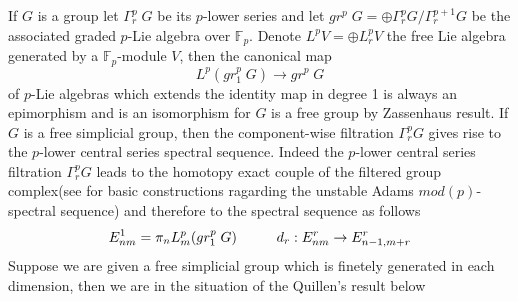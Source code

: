 \documentclass[11pt,a4paper]{article}
\begin{document}
If $G$ is a group let $\Gamma_r^p\; G$ be its $p$-lower series and let $gr^p\; G=\oplus \Gamma_r^p G/\Gamma_r^{p+1} G$ be the associated graded $p$-Lie algebra over $\mathbb{F}_p$.
Denote $L^p V= \oplus L^p_r V$ the free Lie algebra generated by a $\mathbb{F}_p$-module $V$, then the canonical map 
$$L^p(gr^p_1\; G)\rightarrow gr^p \; G$$
of $p$-Lie algebras which extends the identity map in degree 1 is always an epimorphism and is an isomorphism for $G$ is a free group by Zassenhaus result.
If $G$ is a free simplicial group, then the component-wise filtration $\Gamma_r^p G$ gives rise to the $p$-lower central series spectral sequence. Indeed  the $p$-lower central series filtration $\Gamma_r^p G$ leads to the homotopy exact couple of the filtered group complex(see \cite{Rec} for basic constructions ragarding the unstable Adams $mod(p)$-spectral sequence) and therefore to the spectral sequence as follows
$$E^1_{nm}=\pi_n L^p_m( gr_1^p\; G)\hspace{10mm} d_r: E^r_{nm} \rightarrow E^r_{n-1, m+r}$$
Suppose we are given a free simplicial group which is finetely generated in each dimension, then we are in the situation of the Quillen's result \cite[Proposition 1.11]{QUILLEN69} below
\end{document}
